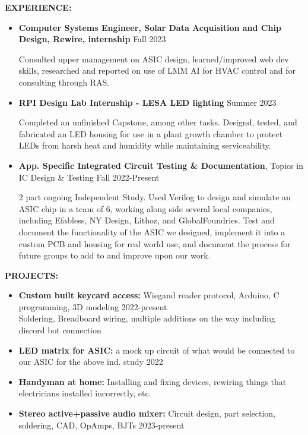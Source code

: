 \documentclass[11pt]{article}
\begin{document}
\textbf{EXPERIENCE:}
\vspace{-0.35cm}
\begin{itemize}
\setlength\itemsep{-.37em}
    \item \textbf{Computer Systems Engineer, Solar Data Acquisition and Chip Design, Rewire, internship} \hfill Fall 2023
    \vspace{-0.15cm}
    \begin{addmargin}[1em]{2em}
        Consulted upper management on ASIC design, learned/improved web dev skills, researched and reported on use of LMM AI for HVAC control and for consulting through RAS.
    \end{addmargin}
    \item \textbf{RPI Design Lab Internship - LESA LED lighting} \hfill Summer 2023
    \vspace{-0.15cm}
    \begin{addmargin}[1em]{2em}
        Completed an unfinished Capstone, among other tasks. Designd, tested, and fabricated an LED housing for use in a plant growth chamber to protect LEDs from harsh heat and humidity while maintaining serviceability. 
    \end{addmargin}
    \item \textbf{App. Specific Integrated Circuit Testing \& Documentation}, Topics in IC Design \& Testing Fall 2022-Present
    \vspace{-0.15cm}
    \vspace{-.5cm}
    \begin{addmargin}[1em]{2em}
        2 part ongoing Independent Study. Used Verilog to design and simulate an ASIC chip in a team of 6, working along side several local companies, including Efabless, NY Design, Lithoz, and GlobalFoundries. Test and document the functionality of the ASIC we designed, implement it into a custom PCB and housing for real world use, and document the process for future groups to add to and improve upon our work.
    \end{addmargin}
\end{itemize}

\textbf{PROJECTS:}
\vspace{-0.35cm}
\begin{itemize}
\setlength\itemsep{-.37em}
    \item \textbf{Custom built keycard access:} Wiegand reader protocol, Arduino, C programming, 3D modeling \hfill 2022-present \\
    Soldering, Breadboard wiring, multiple additions on the way including discord bot connection
    \item \textbf{LED matrix for ASIC:} a mock up circuit of what would be connected to our ASIC for the above ind. study \hfill 2022
    \item \textbf{Handyman at home:} Installing and fixing devices, rewiring things that electricians installed incorrectly, etc.
    \item \textbf{Stereo active+passive audio mixer:} Circuit design, part selection, soldering, CAD, OpAmps, BJTs \hfill 2023-present
\end{itemize}
\end{document}
